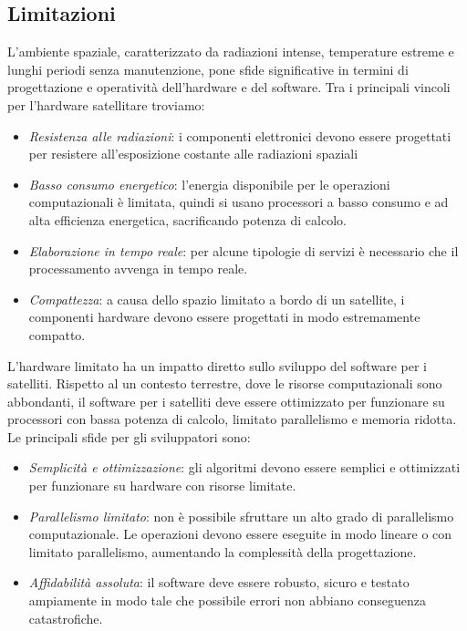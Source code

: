 \subsection{Limitazioni}

L'ambiente spaziale, caratterizzato da radiazioni intense, temperature estreme e lunghi periodi senza manutenzione, pone sfide significative in termini di progettazione e operatività dell'hardware e del software.
Tra i principali vincoli per l'hardware satellitare troviamo:

\begin{itemize}
    \item \textit{Resistenza alle radiazioni}: i componenti elettronici devono essere progettati per resistere all'esposizione costante alle radiazioni spaziali
    \item \textit{Basso consumo energetico}: l'energia disponibile per le operazioni\\ computazionali è limitata, quindi si usano processori a basso consumo e ad alta efficienza energetica, sacrificando potenza di calcolo.
    \item \textit{Elaborazione in tempo reale}: per alcune tipologie di servizi è necessario che il processamento avvenga in tempo reale.
    \item \textit{Compattezza}: a causa dello spazio limitato a bordo di un satellite, i componenti hardware devono essere progettati in modo estremamente compatto.
\end{itemize}

\noindent
L'hardware limitato ha un impatto diretto sullo sviluppo del software per i satelliti. 
Rispetto al un contesto terrestre, dove le risorse computazionali sono abbondanti, il software per i satelliti deve essere ottimizzato per funzionare su processori con bassa potenza di calcolo, limitato parallelismo e memoria ridotta. 
Le principali sfide per gli sviluppatori sono:

\begin{itemize}
    \item \textit{Semplicità e ottimizzazione}: gli algoritmi devono essere semplici e ottimiz\-zati per funzionare su hardware con risorse limitate.
    \item \textit{Parallelismo limitato}: non è possibile sfruttare un alto grado di parallelismo computazionale. Le operazioni devono essere eseguite in modo lineare o con limitato parallelismo, aumentando la complessità della progettazione.
    \item \textit{Affidabilità assoluta}: il software deve essere robusto, sicuro e testato ampiamente in modo tale che possibile errori non abbiano conseguenza catastrofiche.
\end{itemize}

